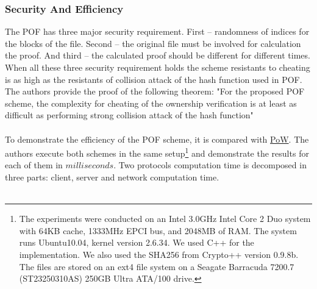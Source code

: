 \documentclass[12pt]{article}
\begin{document}
\subsubsection{Security And Efficiency}
\label{subsub:secAndeff3}


The POF has three major security requirement. First -- randomness of indices for the blocks of the file. Second -- the original file  must be involved for calculation the proof. And third -- the calculated proof should be different for different times. When all these three security requirement holds the scheme resistants to cheating is as high as the resistants of collision attack of the hash function used in POF. The authors provide the proof of the following theorem: "For the proposed POF scheme, the complexity for cheating of the ownership verification is at least as difficult as performing strong collision attack of the hash function"\\\\
To demonstrate the efficiency of the POF scheme, it is compared with \hyperref[sub:Soltuion1]{PoW}. The authors execute both schemes in the same setup\footnote{The experiments were conducted on an Intel 3.0GHz Intel Core 2 Duo system with 64KB cache, 1333MHz EPCI bus, and 2048MB of RAM. The system runs Ubuntu10.04, kernel version 2.6.34. We used C++ for the implementation. We also used the SHA256 from Crypto++ version 0.9.8b\cite{crypto}. The files are stored on an ext4 file system on a Seagate Barracuda 7200.7 (ST23250310AS) 250GB Ultra
ATA/100 drive.} and demonstrate the results for each of them in $milliseconds$. Two protocols computation time is decomposed in three parts: client, server and network computation time.\\\\ 
\end{document}

